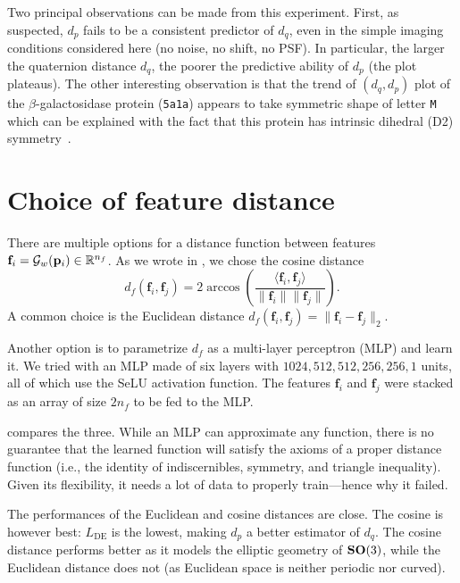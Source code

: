 Two principal observations can be made from this experiment.
First, as suspected, $d_p$ fails to be a consistent predictor of $d_q$, even in the simple imaging conditions considered here (no noise, no shift, no PSF).
In particular, the larger the quaternion distance $d_q$, the poorer the predictive ability of $d_p$ (the plot plateaus).
The other interesting observation is that the trend of $(d_q,d_p)$ plot of the $\beta$-galactosidase protein (\texttt{5a1a}) appears to take symmetric shape of letter \texttt{M} which can be explained with the fact that this protein has intrinsic dihedral (D2) symmetry~\cite{noauthor_d2sym_nodate,noauthor_5a1asym_nodate}.

\section{Choice of feature distance}\label{apx:de-influence-arch}


There are multiple options for a distance function between features $\mathbf{f}_i = \mathcal{G}_w(\mathbf{p}_i) \in \mathbb{R}^{n_f}$.
As we wrote in , we chose the cosine distance
\begin{equation*}
    d_f(\mathbf{f}_i,\mathbf{f}_j) = 2 \arccos \left( \frac{\langle \mathbf{f}_i, \mathbf{f}_j \rangle}{\lVert \mathbf{f}_i \rVert \lVert \mathbf{f}_j \rVert} \right).
\end{equation*}
A common choice is the Euclidean distance $d_f(\mathbf{f}_i, \mathbf{f}_j) = \| \mathbf{f}_i - \mathbf{f}_j \|_2$.

Another option is to parametrize $d_f$ as a multi-layer perceptron (MLP) and learn it.
We tried with an MLP made of six layers with $1024, 512, 512, 256, 256, 1$ units, all of which use the SeLU activation function.
The features $\mathbf{f}_i$ and $\mathbf{f}_j$ were stacked as an array of size $2n_f$ to be fed to the MLP.

 compares the three.
While an MLP can approximate any function, there is no guarantee that the learned function will satisfy the axioms of a proper distance function (i.e., the identity of indiscernibles, symmetry, and triangle inequality).
Given its flexibility, it needs a lot of data to properly train---hence why it failed.

The performances of the Euclidean and cosine distances are close.
The cosine is however best: $L_\text{DE}$ is the lowest, making $d_p$ a better estimator of $d_q$.
The cosine distance performs better as it models the elliptic geometry of $\mathrm{\mathbf{SO}}(3)$, while the Euclidean distance does not (as Euclidean space is neither periodic nor curved).

